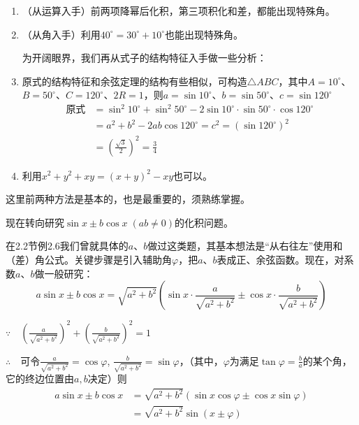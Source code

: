 \begin{analyze}
\begin{enumerate}
    \item （从运算入手）前两项降幂后化积，第三项积化和差，都能出现特殊角。
    \item （从角入手）利用$40^{\circ} =30^{\circ} +10^{\circ}$也能出现特殊角。
    
    为开阔眼界，我们再从式子的结构特征入手做一些分析：

\item 原式的结构特征和余弦定理的结构有些相似，可构造$\triangle ABC$，其中$A=10^{\circ}$、$B=50^{\circ}$、$C=120^{\circ}$、$2R=1$，则$a=\sin10^{\circ}$、$b=\sin50^{\circ}$、$c=\sin120^{\circ}$
\[\begin{split}
\text{原式}&=\sin^2 10^{\circ} +\sin^2 50^{\circ} -2\sin10^{\circ} \cdot\sin50^{\circ} \cdot \cos120^{\circ}\\
&    =a^2+b^2-2ab\cos120^{\circ} =c^2=(\sin120^{\circ} )^2\\
&=\left(\frac{\sqrt{3}}{2}\right)^2=\frac{3}{4}
\end{split}\]
\item 利用$x^2+y^2+xy=(x+y)^2-xy$也可以。
\end{enumerate}
\end{analyze}

\begin{remark}
    这里前两种方法是基本的，也是最重要的，须熟练掌握。    
\end{remark}

现在转向研究$\sin x\pm b\cos x\; (ab\ne 0)$的化积问题。

在2.2节例2.6我们曾就具体的$a$、$b$做过这类题，其基本想法是“从右往左”使用和（差）角公式。关键步骤是引入辅助角$\varphi$，把$a$、$b$表成正、余弦函数。现在，对系数$a$、$b$做一般研究：
\[a\sin x\pm b\cos x=\sqrt{a^2+b^2}\left(\sin x\cdot \frac{a}{\sqrt{a^2+b^2}}\pm \cos x\cdot \frac{b}{\sqrt{a^2+b^2}}\right)\]

$\because\quad \left(\frac{a}{\sqrt{a^2+b^2}}\right)^2+\left(\frac{b}{\sqrt{a^2+b^2}}\right)^2=1$

$\therefore\quad $可令$\frac{a}{\sqrt{a^2+b^2}}=\cos\varphi$, $\frac{b}{\sqrt{a^2+b^2}}=\sin\varphi$，（其中，$\varphi$为满足$\tan\varphi=\frac{b}{a}$的某个角，它的终边位置由$a,b$决定）则
\[\begin{split}
    a\sin x\pm b\cos x&=\sqrt{a^2+b^2}(\sin x\cos\varphi\pm \cos x\sin\varphi)\\
    &=\sqrt{a^2+b^2}\sin(x\pm\varphi)
\end{split}\]


